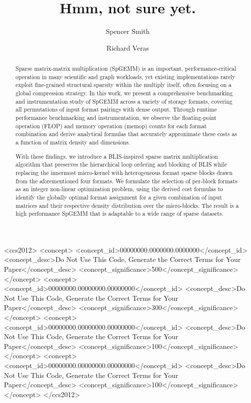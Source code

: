 \documentclass[sigconf]{acmart}
\begin{document}
\title{Hmm, not sure yet.}

\author{Spencer Smith}

\author{Richard Veras}

\begin{abstract}
Sparse matrix-matrix multiplication (SpGEMM) is an important, performance-critical operation in many scientific and graph workloads, yet existing implementations rarely exploit fine-grained structural sparsity within the multiply itself, often focusing on a global compression strategy. In this work, we present a comprehensive benchmarking and instrumentation study of SpGEMM across a variety of storage formats, covering all permutations of input format pairings with dense output. Through runtime performance benchmarking and instrumentation, we observe the floating-point operation (FLOP) and memory operation (memop) counts for each format combination and derive analytical formulas that accurately approximate these costs as a function of matrix density and dimensions.

With these findings, we introduce a BLIS-inspired sparse matrix multiplication algorithm that preserves the hierarchical loop ordering and blocking of BLIS while replacing the innermost micro-kernel with heterogeneous format sparse blocks drawn from the aforementioned four formats. We formulate the selection of per-block formats as an integer non-linear optimization problem, using the derived cost formulas to identify the globally optimal format assignment for a given combination of input matrices and their respective density distribution over the micro-blocks. The result is a high performance SpGEMM that is adaptable to a wide range of sparse datasets.
\end{abstract}

\begin{CCSXML}
<ccs2012>
 <concept>
  <concept_id>00000000.0000000.0000000</concept_id>
  <concept_desc>Do Not Use This Code, Generate the Correct Terms for Your Paper</concept_desc>
  <concept_significance>500</concept_significance>
 </concept>
 <concept>
  <concept_id>00000000.00000000.00000000</concept_id>
  <concept_desc>Do Not Use This Code, Generate the Correct Terms for Your Paper</concept_desc>
  <concept_significance>300</concept_significance>
 </concept>
 <concept>
  <concept_id>00000000.00000000.00000000</concept_id>
  <concept_desc>Do Not Use This Code, Generate the Correct Terms for Your Paper</concept_desc>
  <concept_significance>100</concept_significance>
 </concept>
 <concept>
  <concept_id>00000000.00000000.00000000</concept_id>
  <concept_desc>Do Not Use This Code, Generate the Correct Terms for Your Paper</concept_desc>
  <concept_significance>100</concept_significance>
 </concept>
</ccs2012>
\end{CCSXML}
\end{document}
